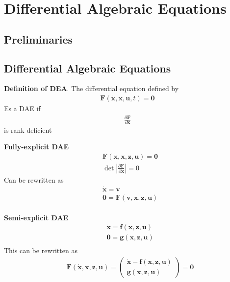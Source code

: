 \setcounter{section}{4}
\section{Differential Algebraic Equations}
\setcounter{section}{14}
\setcounter{subsection}{1}
\subsection{Preliminaries} %

\setcounter{section}{5}
\setcounter{subsection}{0}
\subsection{Differential Algebraic Equations} %

\textbf{Definition of DEA}. The differential equation defined by
\begin{align*}
    \bm{F}(\dot{\bm{x}},\bm{x},\bm{u},t) = \bm{0}
\end{align*}
Es a DAE if
\begin{align*}
    \frac{\partial \bm{F}}{\partial \dot{\bm{x}}} 
\end{align*}
is rank deficient
\newline

\textbf{Fully-explicit DAE}
\begin{align*}
    & \bm{F}(\dot{\bm{x}},\bm{x},\bm{z},\bm{u}) = \bm{0} \\
    & \det\left|\frac{\partial \bm{F}}{\partial \dot{\bm{x}}}\right| = 0
\end{align*}
Can be rewritten as
\begin{align*}
    & \dot{\bm{x}} = \bm{v} \\
    & \bm{0} = \bm{F}(\bm{v},\bm{x},\bm{z},\bm{u}) \\
\end{align*}

\textbf{Semi-explicit DAE}
\begin{align*}
    & \dot{\bm{x}} = \bm{f}(\bm{x},\bm{z},\bm{u}) \\
    & \bm{0} = \bm{g}(\bm{x},\bm{z},\bm{u}) \\
\end{align*}
This can be rewritten as
\begin{align*}
    & \bm{F}(\dot{\bm{x}},\bm{x},\bm{z},\bm{u}) = \begin{pmatrix}
        \dot{\bm{x}} - \bm{f}(\bm{x},\bm{z},\bm{u}) \\ \bm{g}(\bm{x},\bm{z},\bm{u})
    \end{pmatrix} = \bm{0}\\
\end{align*}

